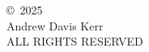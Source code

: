 \vspace*{7in}
\begin{center}
\copyright~2025\\
Andrew Davis Kerr\\
ALL RIGHTS RESERVED
\end{center}
\newpage